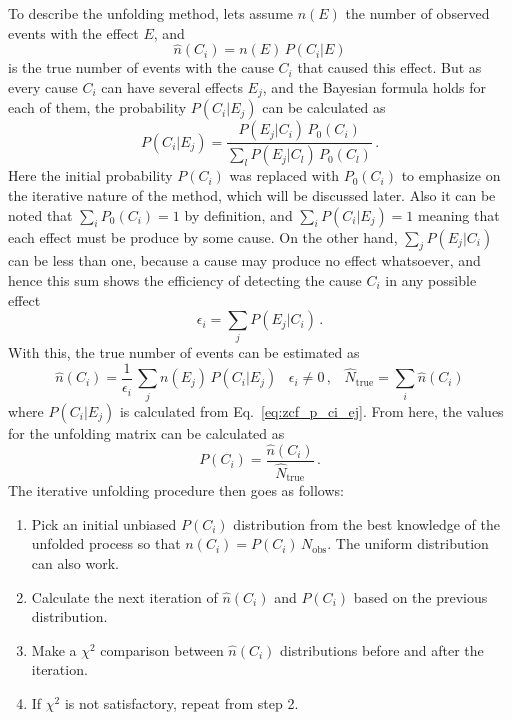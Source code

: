 To describe the unfolding method, lets assume $n(E)$ the number of observed events with the effect $E$, and
\begin{equation}
\hat{n}(C_i) = n(E) \, P(C_i|E)
\end{equation}
is the true number of events with the cause $C_i$ that caused this effect. But as every cause $C_i$ can have several effects $E_j$, and the Bayesian formula holds for each of them, the probability $P(C_i|E_j)$ can be calculated as
\begin{equation}
P(C_i|E_j) = \frac{P(E_j|C_i) \, P_0(C_i)}{\sum\limits_l P(E_j|C_l) \, P_0(C_l)} \,.
\label{eq:zcf_p_ci_ej}
\end{equation}
Here the initial probability $P(C_i)$ was replaced with $P_0(C_i)$ to emphasize on the iterative nature of the method, which will be discussed later. Also it can be noted that $\sum_i P_0(C_i) = 1$ by definition, and $\sum_i P(C_i|E_j) = 1$ meaning that each effect must be produce by some cause. On the other hand, $\sum_j P(E_j|C_i)$ can be less than one, because a cause may produce no effect whatsoever, and hence this sum shows the efficiency of detecting the cause $C_i$ in any possible effect
\begin{equation}
\epsilon_i = \sum\limits_j P(E_j|C_i) \,.
\end{equation}
With this, the true number of events can be estimated as
\begin{equation}
\hat{n}(C_i) = \frac{1}{\epsilon_i} \, \sum\limits_j n(E_j) \, P(C_i|E_j)\;\;\; \epsilon_i \neq 0\,, \;\;\;
\hat{N}_\mathrm{true} = \sum\limits_i \hat{n}(C_i)
\end{equation}
where $P(C_i|E_j)$ is calculated from Eq.~\ref{eq:zcf_p_ci_ej}. From here, the values for the unfolding matrix can be calculated as
\begin{equation}
P(C_i) = \frac{\hat{n}(C_i)}{\hat{N}_\mathrm{true}}\,.
\end{equation}
The iterative unfolding procedure then goes as follows:
\begin{enumerate}
\item Pick an initial unbiased $P(C_i)$ distribution from the best knowledge of the unfolded process so that $n(C_i) = P(C_i)\,N_\mathrm{obs}$. The uniform distribution can also work.
\item Calculate the next iteration of $\hat{n}(C_i)$ and $P(C_i)$ based on the previous distribution.
\item Make a $\chi^2$ comparison between $\hat{n}(C_i)$ distributions before and after the iteration.
\item If $\chi^2$ is not satisfactory, repeat from step 2.
\end{enumerate}
